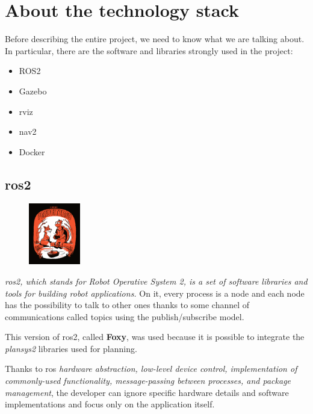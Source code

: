 \chapter{About the technology stack}
\label{cha:techstack}

Before describing the entire project, we need to know what we are talking about. In particular, there are the software and libraries strongly used in the project:  
\begin{itemize}
    \item ROS2
    \item Gazebo
    \item \acrfull{rviz}
    \item \acrfull{nav2}
    \item Docker
\end{itemize}

\section{\acrshort{ros}2} %

\begin{figure}
    \includegraphics[width=0.2\textwidth]{images/foxy}
\end{figure}

\textit{\acrshort{ros}2, which stands for Robot Operative System 2, is a set of software libraries and tools for building robot applications.}\cite{ros2desc} On it, every process is a node and each node has the possibility to talk to other ones thanks to some channel of communications called topics using the publish/subscribe model.

This version of \acrshort{ros}2, called \textbf{Foxy}, was used because it is possible to integrate the \textit{plansys2} libraries used for planning.

Thanks to \Acrshort{ros} \textit{hardware abstraction, low-level device control, implementation of commonly-used functionality, message-passing between processes, and package management}\cite{ros2help}, the developer can ignore specific hardware details and software implementations and focus only on the application itself. 

